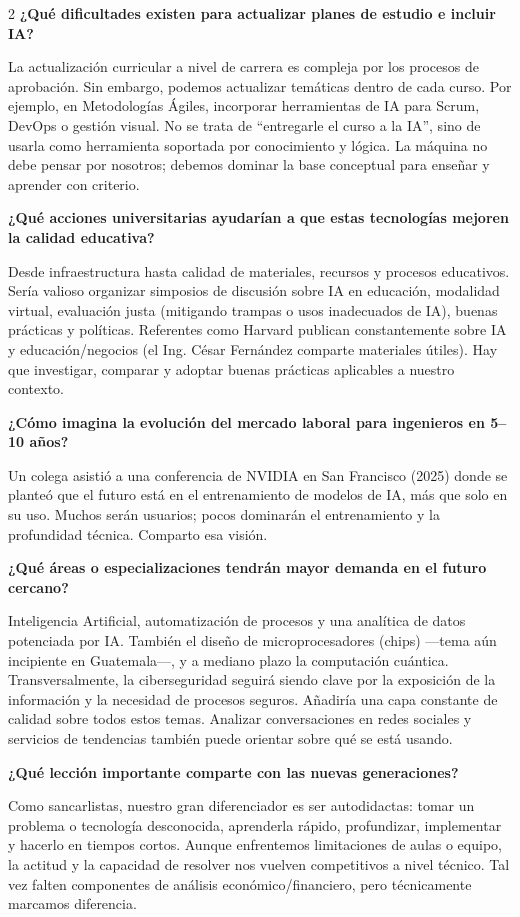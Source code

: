 \documentclass[12pt,spanish,Letterpaper,openany]{book}
\begin{document}
\begin {multicols}{2}
\textbf{¿Qué dificultades existen para actualizar planes de estudio e incluir IA?}

La actualización curricular a nivel de carrera es compleja por los procesos de aprobación. Sin embargo, podemos actualizar temáticas dentro de cada curso. Por ejemplo, en Metodologías Ágiles, incorporar herramientas de IA para Scrum, DevOps o gestión visual.
No se trata de ``entregarle el curso a la IA'', sino de usarla como herramienta soportada por conocimiento y lógica. La máquina no debe pensar por nosotros; debemos dominar la base conceptual para enseñar y aprender con criterio.

\textbf{¿Qué acciones universitarias ayudarían a que estas tecnologías mejoren la calidad educativa?}

Desde infraestructura hasta calidad de materiales, recursos y procesos educativos. Sería valioso organizar simposios de discusión sobre IA en educación, modalidad virtual, evaluación justa (mitigando trampas o usos inadecuados de IA), buenas prácticas y políticas.
Referentes como Harvard publican constantemente sobre IA y educación/negocios (el Ing. César Fernández comparte materiales útiles). Hay que investigar, comparar y adoptar buenas prácticas aplicables a nuestro contexto.

\textbf{¿Cómo imagina la evolución del mercado laboral para ingenieros en 5--10 años?}

Un colega asistió a una conferencia de NVIDIA en San Francisco (2025) donde se planteó que el futuro está en el entrenamiento de modelos de IA, más que solo en su uso. Muchos serán usuarios; pocos dominarán el entrenamiento y la profundidad técnica. Comparto esa visión.

\textbf{¿Qué áreas o especializaciones tendrán mayor demanda en el futuro cercano?}

Inteligencia Artificial, automatización de procesos y una analítica de datos potenciada por IA. También el diseño de microprocesadores (chips) ---tema aún incipiente en Guatemala---, y a mediano plazo la computación cuántica.
Transversalmente, la ciberseguridad seguirá siendo clave por la exposición de la información y la necesidad de procesos seguros. Añadiría una capa constante de calidad sobre todos estos temas. Analizar conversaciones en redes sociales y servicios de tendencias también puede orientar sobre qué se está usando.

\textbf{¿Qué lección importante comparte con las nuevas generaciones?}

Como sancarlistas, nuestro gran diferenciador es ser autodidactas: tomar un problema o tecnología desconocida, aprenderla rápido, profundizar, implementar y hacerlo en tiempos cortos.
Aunque enfrentemos limitaciones de aulas o equipo, la actitud y la capacidad de resolver nos vuelven competitivos a nivel técnico. Tal vez falten componentes de análisis económico/financiero, pero técnicamente marcamos diferencia.


\end{multicols}
\end{document}
